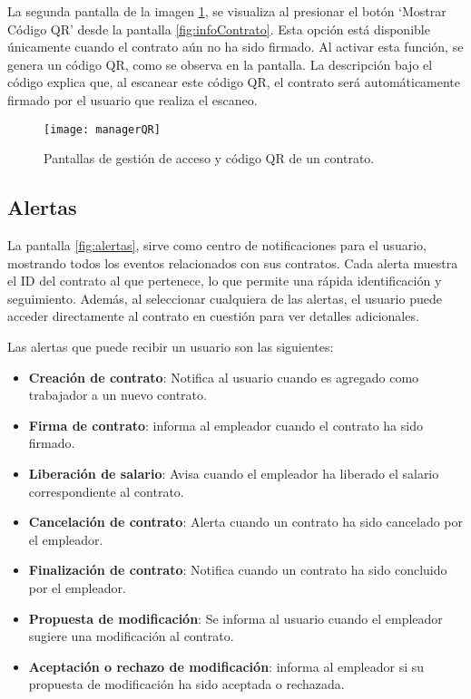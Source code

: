 La segunda pantalla de la imagen \ref{fig:managerQR}, se visualiza al presionar el botón `Mostrar Código QR' desde la pantalla \ref{fig:infoContrato}.
Esta opción está disponible únicamente cuando el contrato aún no ha sido firmado. Al activar esta función, se genera un código QR, como se observa en la pantalla. La descripción bajo el código explica que, al escanear este código QR, el contrato será automáticamente firmado por el usuario que realiza el escaneo.

\begin{figure}[h]
	\centering
	\texttt{[image: managerQR]}
	\caption[Pantalla añadir mánager y código QR]{Pantallas de gestión de acceso y código QR de un contrato.}
	\label{fig:managerQR}
\end{figure}


\subsection{Alertas}

La pantalla \ref{fig:alertas}, sirve como centro de notificaciones para el usuario, mostrando todos los eventos relacionados con sus contratos.
Cada alerta muestra el ID del contrato al que pertenece, lo que permite una rápida identificación y seguimiento. Además, al seleccionar cualquiera de las alertas, el usuario puede acceder directamente al contrato en cuestión para ver detalles adicionales.

Las alertas que puede recibir un usuario son las siguientes:
\begin{itemize}
\item \textbf{Creación de contrato}: Notifica al usuario cuando es agregado como trabajador a un nuevo contrato.

\item \textbf{Firma de contrato}: informa al empleador cuando el contrato ha sido firmado.

\item \textbf{Liberación de salario}: Avisa cuando el empleador ha liberado el salario correspondiente al contrato.

\item \textbf{Cancelación de contrato}: Alerta cuando un contrato ha sido cancelado por el empleador.

\item \textbf{Finalización de contrato}: Notifica cuando un contrato ha sido concluido por el empleador.

\item \textbf{Propuesta de modificación}: Se informa al usuario cuando el empleador sugiere una modificación al contrato.

\item \textbf{Aceptación o rechazo de modificación}: informa al empleador si su propuesta de modificación ha sido aceptada o rechazada.
\end{itemize}

